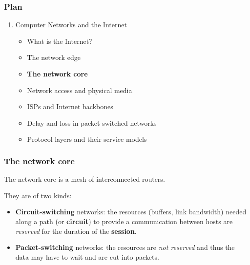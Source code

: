 
%
\begin{frame}
\frametitle{Plan}

\begin{enumerate}

  \item Computer Networks and the Internet

    \begin{itemize}

      \item What is the Internet?

      \item The network edge

      \item \textbf{The network core}

      \item Network access and physical media

      \item ISPs and Internet backbones

      \item Delay and loss in packet-switched networks
 
      \item Protocol layers and their service models

    \end{itemize}

\end{enumerate}

\end{frame}

%
\begin{frame}
\frametitle{The network core}

The network core is a mesh of interconnected routers. 

\bigskip

They are of two kinds:
\begin{itemize}

  \item \textbf{Circuit-switching} networks: the resources (buffers,
    link bandwidth) needed along a path (or \textbf{circuit}) to
    provide a communication between hosts are \emph{reserved} for the
    duration of the \textbf{session}.

  \item \textbf{Packet-switching} networks: the resources are
    \emph{not reserved} and thus the data may have to wait and are cut
    into packets.

\end{itemize}

\end{frame}

